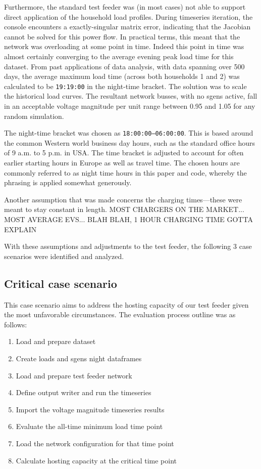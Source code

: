 \documentclass[a4paper,10pt]{report}
\begin{document}
Furthermore, the standard test feeder was (in most cases) not able to support direct application of the household load profiles. During timeseries iteration, the console encounters a exactly-singular matrix error, indicating that the Jacobian cannot be solved for this power flow. In practical terms, this meant that the network was overloading at some point in time. Indeed this point in time was almost certainly converging to the average evening peak load time for this dataset. From past applications of data analysis, with data spanning over 500 days, the average maximum load time (across both households 1 and 2) was calculated to be \texttt{19:19:00} in the night-time bracket. The solution was to scale the historical load curves. The resultant network busses, with no sgens active, fall in an acceptable voltage magnitude per unit range between 0.95 and 1.05 for any random simulation.

The night-time bracket was chosen as \texttt{18:00:00--06:00:00}. This is based around the common Western world business day hours, such as the standard office hours of 9 a.m. to 5 p.m. in USA. The time bracket is adjusted to account for often earlier starting hours in Europe as well as travel time. The chosen hours are commonly referred to as night time hours in this paper and code, whereby the phrasing is applied somewhat generously.

Another assumption that was made concerns the charging times---these were meant to stay constant in length. MOST CHARGERS ON THE MARKET... MOST AVERAGE EVS... BLAH BLAH, 1 HOUR CHARGING TIME GOTTA EXPLAIN

With these assumptions and adjustments to the test feeder, the following 3 case scenarios were identified and analyzed.

\subsection{Critical case scenario}
This case scenario aims to address the hosting capacity of our test feeder given the most unfavorable circumstances. The evaluation process outline was as follows:
\begin{enumerate}
	\item Load and prepare dataset
	\item Create loads and sgens night dataframes
	\item Load and prepare test feeder network
	\item Define output writer and run the timeseries
	\item Import the voltage magnitude timeseries results
	\item Evaluate the all-time minimum load time point
	\item Load the network configuration for that time point
	\item Calculate hosting capacity at the critical time point
\end{enumerate}
\end{document}
